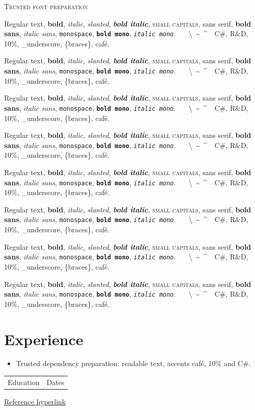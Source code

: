 \usepackage{geometry,array,fancyhdr}
\hypersetup{hidelinks}
\newcommand{\ResumeFontShapes}{%
  Regular text, \textbf{bold}, \textit{italic}, \textsl{slanted},
  \textbf{\textit{bold italic}}, \textsc{small capitals},
  \textsf{sans serif}, \textsf{\textbf{bold sans}}, \textsf{\textit{italic sans}},
  \texttt{monospace}, \texttt{\textbf{bold mono}}, \texttt{\textit{italic mono}}.
  \textbullet\ \textendash\ \textemdash\ \textbackslash\ \textasciitilde\ \textasciicircum\ \textbar\
  C\#, R\&D, 10\%, \_underscore, \{braces\}, caf\'e.\par}

\begin{center}
{\Huge \scshape Trusted font preparation} \\
{\small \faPhone{} \faEnvelope{} \faLinkedinSquare{} \faGithub{}
\faHackerrank{} \faPoll{} \faExternalLink{} \faGlobe{}}
\end{center}
\ResumeFontShapes
{\small\ResumeFontShapes}
{\large\ResumeFontShapes}
{\Large\ResumeFontShapes}
{\LARGE\ResumeFontShapes}
{\huge\ResumeFontShapes}
{\Huge\ResumeFontShapes}
{\fontencoding{TU}\fontfamily{lmr}\selectfont\ResumeFontShapes}
\section*{Experience}
\resumeSubHeadingListStart
{}
\resumeItemListStart
{}
\resumeItemListEnd
{}
\resumeItemListStart
{}
\resumeItemListEnd
{}
\resumeSubHeadingListEnd
\begin{itemize}[leftmargin=*,nosep]
\item Trusted dependency preparation: readable text, accents caf\'e, 10\% and C\#.
\end{itemize}
\begin{tabularx}{\textwidth}{Xr}Education & Dates\end{tabularx}
\href{https://example.org}{Reference hyperlink}

